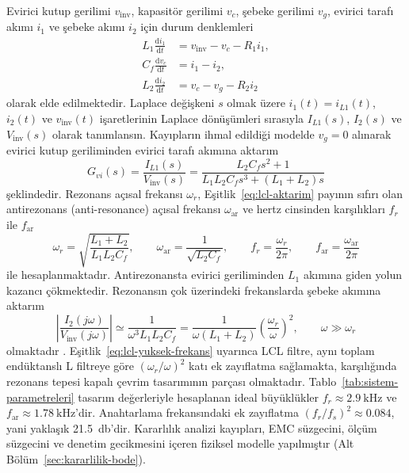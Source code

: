 Evirici kutup gerilimi $v_{\mathrm{inv}}$, kapasitör gerilimi $v_c$, şebeke gerilimi $v_g$, evirici tarafı akımı $i_1$ ve şebeke akımı $i_2$ için durum denklemleri
\begin{equation}
  \begin{aligned}
    L_1\frac{\mathrm{d}i_1}{\mathrm{d}t} &= v_{\mathrm{inv}}-v_c-R_1i_1, \\
    C_f\frac{\mathrm{d}v_c}{\mathrm{d}t} &= i_1-i_2, \\
    L_2\frac{\mathrm{d}i_2}{\mathrm{d}t} &= v_c-v_g-R_2i_2
  \end{aligned}
  \label{eq:lcl-durum-denklemleri}
\end{equation}
olarak elde edilmektedir. Laplace değişkeni $s$ olmak üzere $i_1(t)=i_{L1}(t)$, $i_2(t)$ ve $v_{\mathrm{inv}}(t)$ işaretlerinin Laplace dönüşümleri sırasıyla $I_{L1}(s)$, $I_2(s)$ ve $V_{\mathrm{inv}}(s)$ olarak tanımlansın. Kayıpların ihmal edildiği modelde $v_g=0$ alınarak evirici kutup geriliminden evirici tarafı akımına aktarım
\begin{equation}
  G_{vi}(s)=\frac{I_{L1}(s)}{V_{\mathrm{inv}}(s)}
  =\frac{L_2C_fs^2+1}{L_1L_2C_fs^3+(L_1+L_2)s}
  \label{eq:lcl-aktarim}
\end{equation}
şeklindedir. Rezonans açısal frekansı $\omega_r$, Eşitlik~\eqref{eq:lcl-aktarim} payının sıfırı olan antirezonans (anti-resonance) açısal frekansı $\omega_{\mathrm{ar}}$ ve hertz cinsinden karşılıkları $f_r$ ile $f_{\mathrm{ar}}$
\begin{equation}
  \omega_r=\sqrt{\frac{L_1+L_2}{L_1L_2C_f}},\qquad
  \omega_{\mathrm{ar}}=\frac{1}{\sqrt{L_2C_f}},\qquad
  f_r=\frac{\omega_r}{2\pi},\qquad
  f_{\mathrm{ar}}=\frac{\omega_{\mathrm{ar}}}{2\pi}
  \label{eq:lcl-rezonans}
\end{equation}
ile hesaplanmaktadır. Antirezonansta evirici geriliminden $L_1$ akımına giden yolun kazancı çökmektedir. Rezonansın çok üzerindeki frekanslarda şebeke akımına aktarım
\begin{equation}
  \left|\frac{I_2(j\omega)}{V_{\mathrm{inv}}(j\omega)}\right|
  \simeq\frac{1}{\omega^3L_1L_2C_f}
  =\frac{1}{\omega(L_1+L_2)}\left(\frac{\omega_r}{\omega}\right)^{2},
  \qquad \omega\gg\omega_r
  \label{eq:lcl-yuksek-frekans}
\end{equation}
olmaktadır \citep{Zhang2014PR,Lu2016}. Eşitlik~\eqref{eq:lcl-yuksek-frekans} uyarınca LCL filtre, aynı toplam endüktanslı L filtreye göre $(\omega_r/\omega)^2$ katı ek zayıflatma sağlamakta, karşılığında rezonans tepesi kapalı çevrim tasarımının parçası olmaktadır. Tablo~\ref{tab:sistem-parametreleri} tasarım değerleriyle hesaplanan ideal büyüklükler $f_r\approx\SI{2.9}{\kilo\hertz}$ ve $f_{\mathrm{ar}}\approx\SI{1.78}{\kilo\hertz}$'dir. Anahtarlama frekansındaki ek zayıflatma $(f_r/f_s)^2\approx\num{0.084}$, yani yaklaşık \SI{21.5}{\decibel}'dir. Kararlılık analizi kayıpları, EMC süzgecini, ölçüm süzgecini ve denetim gecikmesini içeren fiziksel modelle yapılmıştır (Alt Bölüm~\ref{sec:kararlilik-bode}).

